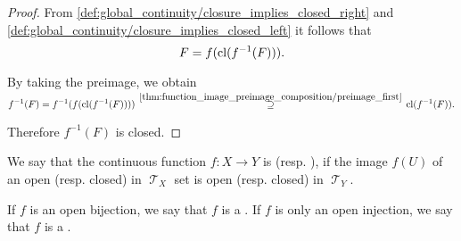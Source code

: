 \begin{proof}
  From \eqref{def:global_continuity/closure_implies_closed_right} and \eqref{def:global_continuity/closure_implies_closed_left} it follows that
  \begin{equation*}
    F = f(\operatorname{cl}(f^{-1}(F))).
  \end{equation*}

  By taking the preimage, we obtain
  \begin{equation*}
    f^{-1}(F)
    =
    f^{-1}(f(\cl(f^{-1}(F))))
    \reloset {\ref{thm:function_image_preimage_composition/preimage_first}} \supseteq
    \cl(f^{-1}(F)).
  \end{equation*}

  Therefore \( f^{-1}(F) \) is closed.
\end{proof}

\begin{definition}\label{def:homeomorphism}
  We say that the continuous function \( f: X \to Y \) is  (resp. ), if the image \( f(U) \) of an open (resp. closed) in \( \mscrT_X \) set is open (resp. closed) in \( \mscrT_Y \).

  If \( f \) is an open bijection, we say that \( f \) is a . If \( f \) is only an open injection, we say that \( f \) is a .
\end{definition}

